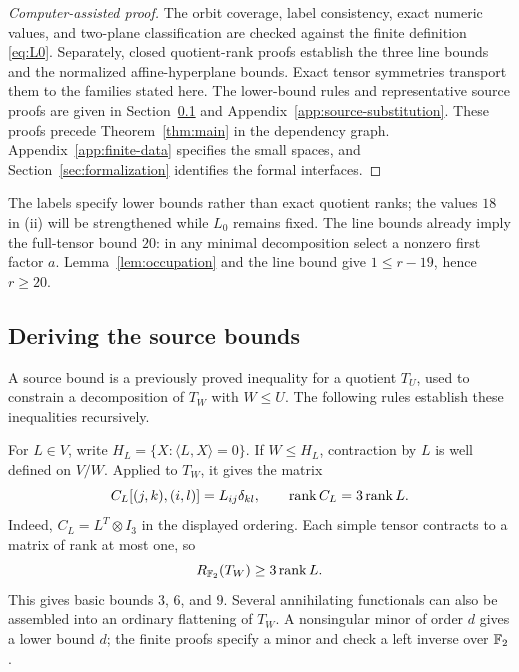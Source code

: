 \begin{proof}[Computer-assisted proof]
The orbit coverage, label consistency, exact numeric values, and
two-plane classification are checked against the finite definition
\eqref{eq:L0}. Separately, closed quotient-rank proofs establish the
three line bounds and the normalized affine-hyperplane bounds.
Exact tensor symmetries transport them to the families stated here.
The lower-bound rules and representative source proofs are given in
Section~\ref{sec:source-bounds} and Appendix~\ref{app:source-substitution}.
These proofs precede Theorem~\ref{thm:main} in the dependency graph.
Appendix~\ref{app:finite-data} specifies the small spaces, and
Section~\ref{sec:formalization} identifies the formal interfaces.
\end{proof}

The labels specify lower bounds rather than exact quotient ranks; the
values $18$ in (ii) will be strengthened while $L_0$ remains fixed.
The line bounds already imply the full-tensor bound $20$: in any
minimal decomposition select a nonzero first factor $a$.
Lemma~\ref{lem:occupation} and the line bound give $1\leq r-19$,
hence $r\geq20$.

\subsection{Deriving the source bounds}\label{sec:source-bounds}
A source bound is a previously proved inequality for a quotient
$T_U$, used to constrain a decomposition of $T_W$ with $W\leq U$.
The following rules establish these inequalities recursively.

For $L\in V$, write $H_L=\{X:\langle L,X\rangle=0\}$.
If $W\leq H_L$, contraction by $L$ is well defined on $V/W$.
Applied to $T_W$, it gives the matrix
\begin{equation}\label{eq:source-contraction}
 C_L[(j,k),(i,l)]=L_{ij}\delta_{kl},\qquad
 \operatorname{rank} C_L=3\operatorname{rank} L.
\end{equation}
Indeed, $C_L=L^T\otimes I_3$ in the displayed ordering. Each
simple tensor contracts to a matrix of rank at most one, so
\begin{equation}\label{eq:contraction-bound}
 R_{\mathbb F_2}(T_W)\geq3\operatorname{rank} L.
\end{equation}
This gives basic bounds $3$, $6$, and $9$. Several annihilating
functionals can also be assembled into an ordinary flattening of
$T_W$. A nonsingular minor of order $d$ gives a lower bound $d$;
the finite proofs specify a minor and check a left inverse over $\mathbb F_2$.

